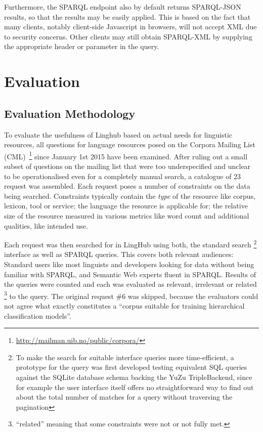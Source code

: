 \documentclass[smallextended]{svjour3}       %
\begin{document}
Furthermore, the SPARQL endpoint also by default returns SPARQL-JSON
results\cite{seaborne2013sparql}, so that the results may be easily applied. This is based on the
fact that many clients, notably client-side Javascript in browsers, will not
accept XML due to security concerns. Other clients may still obtain SPARQL-XML
by supplying the appropriate header or parameter in the query.

\section{Evaluation}
\label{evaluation}

\subsection{Evaluation Methodology}

To evaluate the usefulness of Linghub based on actual needs for linguistic 
resources, all questions for language resources posed on the Corpora Mailing 
List (CML)~\footnote{\url{http://mailman.uib.no/public/corpora/}} since January
1st 2015 have been examined. After ruling out a small subset of questions on the
mailing list that were too underspecified and unclear to be operationalised even
for a completely manual search, a catalogue of 23 request was assembled. Each
request poses a number of constraints on the data being searched. Constraints
typically contain the \emph{type} of the resource like corpus, lexicon, tool or
service; the language the resource is applicable for; the relative size of the
resource measured in various metrics like word count and additional qualities,
like intended use.  

Each request was then searched for in LingHub using both, the standard search
\footnote{To make the search for suitable interface queries more time-efficient,
    a prototype for the query was first developed testing equivalent SQL queries
    against the SQLite database schema backing the YuZu TripleBackend, since for
    example the user interface itself offers no straightforward way to find out
    about the total number of matches for a query without traversing the
pagination}
interface as well as SPARQL queries. This covers both relevant audiences:
Standard users like most linguists and developers looking for data without being
familiar with SPARQL, and Semantic Web experts fluent in SPARQL. Results of the
queries were counted and each was evaluated as relevant, irrelevant or related
\footnote{``related'' meaning that some constraints were not or not fully met.}
to the query. The original request \#6 was skipped, because the evaluators could
not agree what exactly constitutes a ``corpus suitable for training hierarchical
classification models''. 
\end{document}
